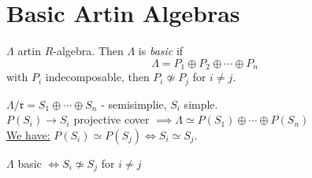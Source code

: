\section{Basic Artin Algebras}
\begin{defin}
$\Lambda$ artin $R$-algebra. Then $\Lambda$ is \emph{basic} if \[\Lambda = P_1 \oplus P_2 \oplus \cdots \oplus P_n\] with $P_i$ indecomposable, then $P_i \not\simeq P_j$ for $i \neq j$.
\end{defin}
\begin{recall}
$\Lambda / \mathfrak{r} = S_1 \oplus \cdots \oplus S_n$ - semisimplie, $S_i$ simple.\\
$P(S_i) \to S_i$ projective cover $\implies \Lambda \simeq P(S_1) \oplus \cdots \oplus  P(S_n)$\\
\underline{We have:} $P(S_i) \simeq P(S_j) \iff S_i \simeq S_j$.
\end{recall}
$\Lambda$ basic $\iff S_i \not\simeq S_j$ for $i \neq j$
